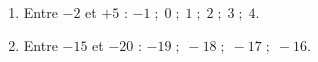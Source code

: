     \ \\ [-5mm]
    \begin{enumerate}
       \item Entre $-2$ et $+5$ : {\red$-1 \; ; \; 0 \; ; \; 1 \; ; \; 2 \; ; \; 3 \; ; \; 4$}. \smallskip
       \item Entre $-15$ et $-20$ : {\red $-19 \; ; \; -18 \; ; \; -17 \; ; \; -16$}. \smallskip
    \end{enumerate}
